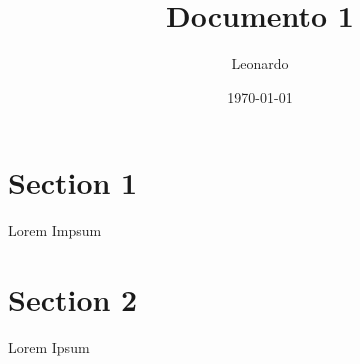 \documentclass[11pt]{article}
\title{ Documento 1}
\author{ Leonardo }
\date{\today}
\begin{document}
\maketitle	
\pagebreak



\section{Section 1}

Lorem Impsum


\pagebreak
\section{Section 2}
Lorem Ipsum \\

\end{document}
